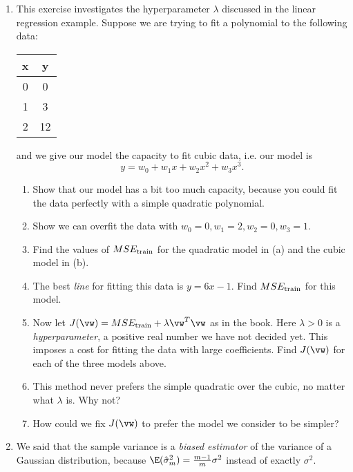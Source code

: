\documentclass{article}
\newcommand{\strain}{_{\textnormal{train}}}
\begin{document}
\begin{enumerate}
\item \label{ML_ex_hyperparameter}
This exercise investigates the hyperparameter $\lambda$ discussed in the linear regression example. Suppose we are trying to fit a polynomial to the following data:
\begin{center}
\begin{tabular}{c|c}
    x & y \\
    \hline
    0 & 0 \\
    1 & 3 \\
    2 & 12
\end{tabular}
\end{center}
and we give our model the capacity to fit cubic data, i.e. our model is
\begin{equation*} y = w_0 + w_1 x + w_2 x^2 + w_3 x^3. \end{equation*}

\begin{enumerate}
    \item Show that our model has a bit too much capacity, because you could fit the data perfectly with a simple quadratic polynomial.
    \item Show we can overfit the data with $w_0 = 0, w_1 = 2, w_2 = 0, w_3 = 1$.
    \item Find the values of $MSE\strain$ for the quadratic model in (a) and the cubic model in (b).
    \item The best \emph{line} for fitting this data is $y = 6x - 1$. Find $MSE\strain$ for this model. 
    \item Now let $J(\vw) = MSE\strain + \lambda \vw^T\vw$ as in the book. Here $\lambda > 0$ is a \emph{hyperparameter}, a positive real number we have not decided yet. This imposes a cost for fitting the data with large coefficients. Find $J(\vw)$ for each of the three models above.
    \item This method never prefers the simple quadratic over the cubic, no matter what $\lambda$ is. Why not? 
    \item How could we fix $J(\vw)$ to prefer the model we consider to be simpler?
\end{enumerate}
    
\item \label{ML_ex_bias} 
We said that the sample variance is a \emph{biased estimator} of the variance of a Gaussian distribution, because $\E(\hat{\sigma}_m^2) = \frac{m-1}{m}\sigma^2$ instead of exactly $\sigma^2$.


\end{enumerate}
\end{document}
